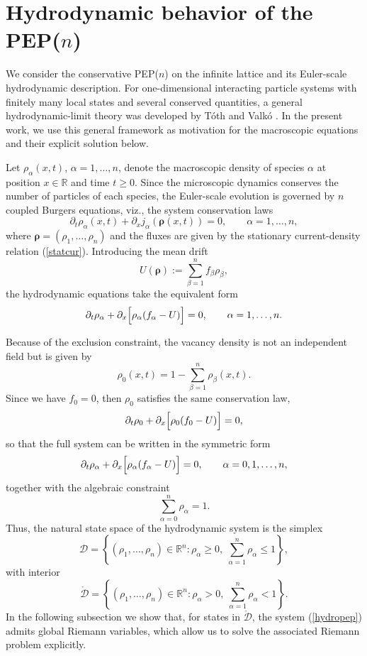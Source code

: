 \documentclass[12pt]{article}
\newcommand{\be}{\begin{equation}}
\newcommand{\bel}[1]{\begin{equation}\label{#1}}
\newcommand{\ee}{\end{equation}}
\newcommand{\eref}[1]{(\ref{#1})}
\newcommand{\R}{{\mathbb R}}
\newcommand{\brho}{\boldsymbol{\rho}}
\begin{document}
\section{Hydrodynamic behavior of the PEP($n$)}
\label{hydro}

We consider the conservative PEP($n$) on the infinite lattice and its
Euler-scale hydrodynamic description. For one-dimensional interacting particle
systems with finitely many local states and several conserved quantities, a
general hydrodynamic-limit theory was developed by T\'oth and Valk\'o
\cite{Toth03}. In the present work, we use this general framework as motivation for the
macroscopic equations and their explicit solution below.

Let $\rho_\alpha(x,t)$, $\alpha=1,\dots,n$, denote the macroscopic density of
species $\alpha$ at position $x\in\R$ and time $t\geq 0$. Since the microscopic
dynamics conserves the number of particles of each species, the Euler-scale
evolution is governed by $n$ coupled Burgers equations, viz., the system conservation laws
\bel{hydropep}
\partial_t \rho_\alpha(x,t)+\partial_x j_\alpha(\brho(x,t))=0,
\qquad \alpha=1,\dots,n,
\ee
where $\brho=(\rho_1,\dots,\rho_n)$ and the fluxes are given by the stationary
current-density relation \eref{statcur}.
Introducing the mean drift
\bel{meandrift}
U(\brho):=\sum_{\beta=1}^n f_\beta \rho_\beta,
\ee
the hydrodynamic equations take the equivalent form
\bel{hydroU}
\partial_t \rho_\alpha+\partial_x\Bigl[\rho_\alpha(f_\alpha-U)\Bigr]=0,
\qquad \alpha=1,\dots,n.
\ee

Because of the exclusion constraint, the vacancy density is not an independent
field but is given by
\be
\rho_0(x,t)=1-\sum_{\beta=1}^n \rho_\beta(x,t).
\ee
Since we have $f_0=0$, then $\rho_0$ satisfies the same conservation law,
\be
\partial_t \rho_0+\partial_x\Bigl[\rho_0(f_0-U)\Bigr]=0,
\ee
so that the full system can be written in the symmetric form
\bel{fullhydro}
\partial_t \rho_\alpha+\partial_x\Bigl[\rho_\alpha(f_\alpha-U)\Bigr]=0,
\qquad \alpha=0,1,\dots,n,
\ee
together with the algebraic constraint
\be
\sum_{\alpha=0}^n \rho_\alpha=1.
\ee
Thus, the natural state space of the hydrodynamic system is the simplex
\be
\mathcal{D}
=
\left\{
(\rho_1,\dots,\rho_n)\in \R^n:
\rho_\alpha\geq 0,\;
\sum_{\alpha=1}^n \rho_\alpha\leq 1
\right\},
\ee
with interior
\be
\mathring{\mathcal{D}}
=
\left\{
(\rho_1,\dots,\rho_n)\in \R^n:
\rho_\alpha>0,\;
\sum_{\alpha=1}^n \rho_\alpha<1
\right\}.
\ee
In the following subsection we show that, for states in
$\mathring{\mathcal{D}}$, the system \eref{hydropep} admits global Riemann
variables, which allow us to solve the associated Riemann problem explicitly.
\end{document}
